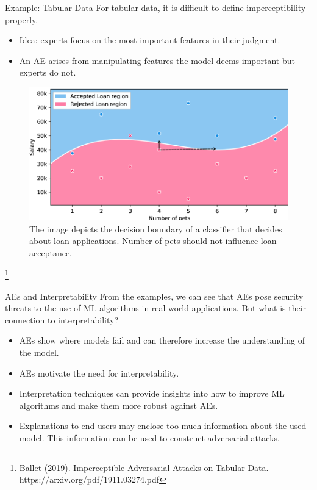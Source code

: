 \documentclass[11pt,compress,t,notes=noshow, xcolor=table]{beamer}
\begin{document}
\begin{vbframe}{Example: Tabular Data}
For tabular data, it is difficult to define imperceptibility properly.%
\begin{itemize}
    \item Idea: experts focus on the most important features in their judgment.
    \item An AE arises from manipulating features the model deems important but experts do not.
\end{itemize}
\begin{figure}[h]
\centering
\includegraphics[width=0.6\linewidth]{figure/AEloanApplication.png}
  \caption{The image depicts the decision boundary of a classifier that decides about loan applications. Number of pets should not influence loan acceptance.}
  \label{fig:mnist}
\end{figure} 
\vspace{-0.75cm}
\footnote[frame]{Ballet (2019). Imperceptible Adversarial Attacks on Tabular Data. https://arxiv.org/pdf/1911.03274.pdf}

\end{vbframe}

\begin{vbframe}{AEs and Interpretability}
From the examples, we can see that AEs pose security threats to the use of ML algorithms in real world applications. But what is their connection to interpretability?

\begin{itemize}
    \item AEs show where models fail and can therefore increase the understanding of the model.
    \item AEs motivate the need for interpretability.
    \item Interpretation techniques can provide insights into how to improve ML algorithms and make them more robust against AEs.
    \item Explanations to end users may enclose too much information about the used model. This information can be used to construct adversarial attacks.
\end{itemize}
\end{vbframe}
\end{document}
